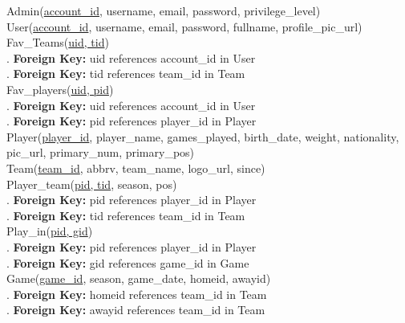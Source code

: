 \documentclass[11pt]{article}
\newenvironment{tabs}[1]
 {\flushleft\TabPositions{#1}}
 {\endflushleft}
\begin{document}
\vspace{40mm}
\begin{tabs}{1cm,2cm}
Admin(\underline{account\_id}, username, email, password, privilege\_level) \\
\vspace{4mm}
User(\underline{account\_id}, username, email, password, fullname, profile\_pic\_url)\\
\vspace{4mm}
Fav\_Teams(\underline{uid, tid})\\
. \tab \textbf{Foreign Key:} uid references account\_id in User\\
. \tab \textbf{Foreign Key:} tid references team\_id in Team\\
\vspace{4mm}
Fav\_players(\underline{uid, pid})\\
. \tab \textbf{Foreign Key:} uid references account\_id in User\\
. \tab \textbf{Foreign Key:} pid references player\_id in Player\\
\vspace{4mm}
Player(\underline{player\_id}, player\_name, games\_played, birth\_date, weight, nationality, pic\_url, primary\_num, primary\_pos) \\
\vspace{4mm}
Team(\underline{team\_id}, abbrv, team\_name, logo\_url, since) \\
\vspace{4mm}
Player\_team(\underline{pid, tid}, season, pos) \\
. \tab \textbf{Foreign Key:} pid references player\_id in Player \\
. \tab \textbf{Foreign Key:} tid references team\_id in Team \\
\vspace{4mm}
Play\_in(\underline{pid, gid}) \\
. \tab \textbf{Foreign Key:} pid references player\_id in Player \\
. \tab \textbf{Foreign Key:} gid references game\_id in Game \\
\vspace{4mm}
Game(\underline{game\_id}, season, game\_date, homeid, awayid) \\
. \tab \textbf{Foreign Key:} homeid references team\_id in Team \\
. \tab \textbf{Foreign Key:} awayid references team\_id in Team \\
\vspace{4mm}
\end{tabs}
\end{document}
